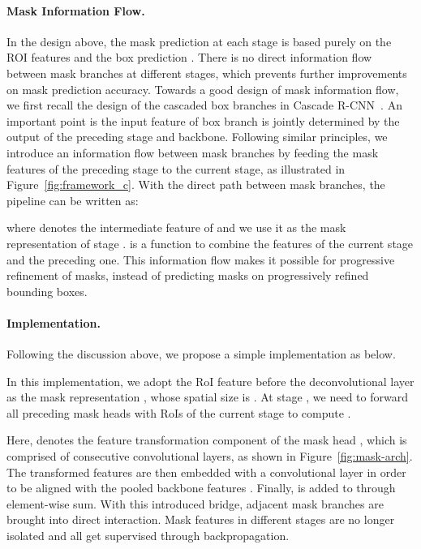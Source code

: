 \documentclass[10pt,twocolumn,letterpaper]{article}
\begin{document}
\vspace{-7pt}
\paragraph{Mask Information Flow.}
In the design above, the mask prediction at each stage is based purely on
the ROI features  and the box prediction . There is no
direct information flow between mask branches at different stages,
which prevents further improvements on mask prediction accuracy.
Towards a good design of mask information flow, we first recall the design of
the cascaded box branches in Cascade R-CNN~\cite{cai18cascadercnn}.
An important point is the input feature of box branch is jointly determined by
the output of the preceding stage and backbone.
Following similar principles, we introduce an information flow between mask
branches by feeding the mask features of the preceding stage to the current stage,
as illustrated in Figure~\ref{fig:framework_c}.
With the direct path between mask branches, the pipeline can be written as:

where  denotes the intermediate feature of  and we use it as
the mask representation of stage .
 is a function to combine the features of the current stage and the preceding one.
This information flow makes it possible for progressive refinement of masks,
instead of predicting masks on progressively refined bounding boxes.

\vspace{-7pt}
\paragraph{Implementation.}
Following the discussion above, we propose a simple implementation
as below.

In this implementation, we adopt the RoI feature before the deconvolutional
layer as the mask representation , whose spatial size is .
At stage , we need to forward all preceding mask heads with RoIs of the current stage to compute .

Here,  denotes the feature transformation component of the
mask head , which is comprised of  consecutive  convolutional
layers, as shown in Figure~\ref{fig:mask-arch}.
The transformed features  are then embedded with
a  convolutional layer  in order to be aligned with
the pooled backbone features .
Finally,  is added to  through element-wise
sum.
With this introduced bridge, adjacent mask branches are brought into direct
interaction. Mask features in different stages are no longer isolated and
all get supervised through backpropagation.
\end{document}
